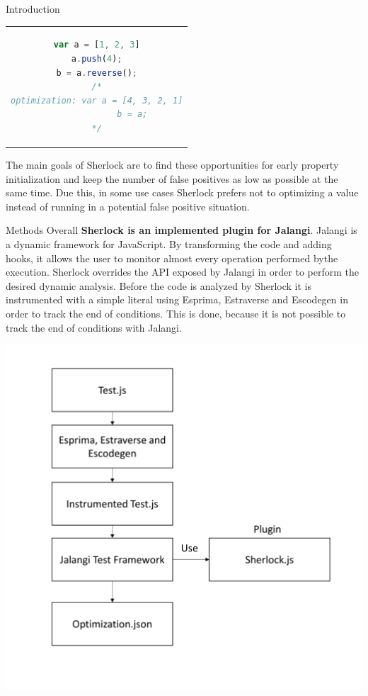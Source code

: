 \documentclass[a1paper,portrait,fontscale=0.418]{baposter}
\begin{document}
\begin{poster}
\begin{posterbox}[name=introduction,column=0,row=0]{Introduction}
\begin{center}
\begin{tabular}{|c}
\begin{lstlisting}[language=Javascript]
var a = [1, 2, 3]
a.push(4);
b = a.reverse();
/*
optimization: var a = [4, 3, 2, 1]
              b = a;
*/

\end{lstlisting}

\end{tabular}
\label{list1}
\end{center}

The main goals of Sherlock are to find these opportunities for early property initialization and keep the number of false positives as low as possible at the same time. Due this, in some use cases Sherlock prefers not to optimizing a value instead of running in a potential false positive situation.
\end{posterbox}

\begin{posterbox}[name=methods,column=0,below=introduction]{Methods}
Overall \textbf{Sherlock is an implemented plugin for Jalangi}. Jalangi is a dynamic framework for JavaScript. By transforming the code and adding hooks, it allows the user to monitor almost every operation performed bythe execution. Sherlock overrides the API exposed by Jalangi in order to perform the desired dynamic analysis. Before the code is analyzed by Sherlock it is instrumented with a simple literal using Esprima, Estraverse and Escodegen in order to track the end of conditions. This is done, because it is not possible to track the end of conditions with Jalangi.

\begin{center}
\includegraphics[width=0.8\linewidth]{architecture.png}
\label{fig1}


\end{center}
\end{posterbox}
\end{poster}
\end{document}
